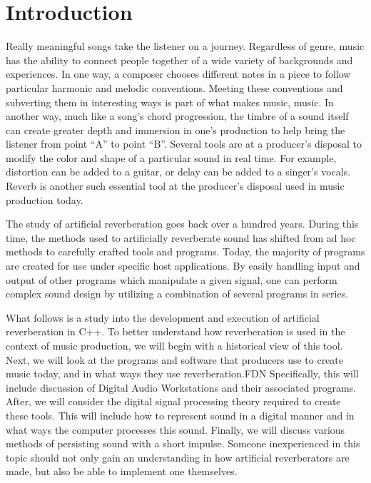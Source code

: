 \chapter{Introduction}\label{intro}
\hspace*{-0.155cm}Really meaningful songs take the listener on a journey. Regardless of genre, music has the ability to connect people together of a wide variety of backgrounds and experiences. In one way, a composer chooses different notes in a piece to follow particular harmonic and melodic conventions. Meeting these conventions and subverting them in interesting ways is part of what makes music, music. In another way, much like a song's chord progression, the timbre of a sound itself can create greater depth and immersion in one's production to help bring the listener from point ``A'' to point ``B''. Several tools are at a producer's disposal to modify the color and shape of a particular sound in real time. For example, distortion can be added to a guitar, or delay can be added to a singer's vocals. Reverb is another such essential tool at the producer's disposal used in music production today.

The study of artificial reverberation goes back over a hundred years. During this time, the methods used to artificially reverberate sound has shifted from ad hoc methods to carefully crafted tools and programs. Today, the majority of programs are created for use under specific host applications. By easily handling input and output of other programs which manipulate a given signal, one can perform complex sound design by utilizing a combination of several programs in series.

What follows is a study into the development and execution of artificial reverberation in C++. To better understand how reverberation is used in the context of music production, we will begin with a historical view of this tool. Next, we will look at the programs and software that producers use to create music today, and in what ways they use reverberation.FDN Specifically, this will include discussion of Digital Audio Workstations and their associated programs. After, we will consider the digital signal processing theory required to create these tools. This will include how to represent sound in a digital manner and in what ways the computer processes this sound. Finally, we will discuss various methods of persisting sound with a short impulse. Someone inexperienced in this topic should not only gain an understanding in how artificial reverberators are made, but also be able to implement one themselves.
